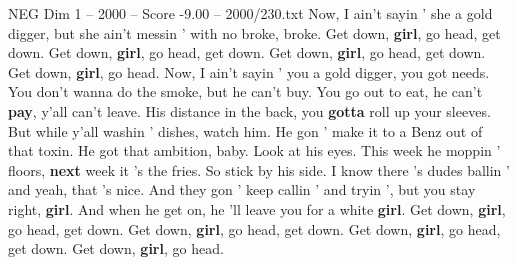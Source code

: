 \begin{textsample}{NEG Dim 1 – 2000 – Score -9.00 – 2000/230.txt}
Now, I ain't sayin ' she a gold digger, but she ain't messin ' with no broke, broke.
Get down, \textbf{girl}, go head, get down.
Get down, \textbf{girl}, go head, get down.
Get down, \textbf{girl}, go head, get down.
Get down, \textbf{girl}, go head.
Now, I ain't sayin ' you a gold digger, you got needs.
You don't wanna do the smoke, but he can't buy.
You go out to eat, he can't \textbf{pay}, y'all can't leave.
His distance in the back, you \textbf{gotta} roll up your sleeves.
But while y'all washin ' dishes, watch him.
He gon ' make it to a Benz out of that toxin.
He got that ambition, baby.
Look at his eyes.
This week he moppin ' floors, \textbf{next} week it 's the fries.
So stick by his side.
I know there 's dudes ballin ' and yeah, that 's nice.
And they gon ' keep callin ' and tryin ', but you stay right, \textbf{girl}.
And when he get on, he 'll leave you for a white \textbf{girl}.
Get down, \textbf{girl}, go head, get down.
Get down, \textbf{girl}, go head, get down.
Get down, \textbf{girl}, go head, get down.
Get down, \textbf{girl}, go head.

\end{textsample}
